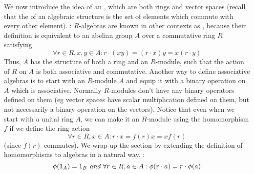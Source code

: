 \documentclass{article}
\begin{document}
\nn
We now introduce the idea of an , which are both rings and vector spaces (recall that the  of an algebraic structure is the set of elements which commute with every other element).
\nn
{}: 
\n
\Mo $ R $-algebras are known in other contexts as , because their definition is equivalent to an abelian group $ A $ over a commutative ring $ R $ satisfying
$$ \forall r \in R, x, y \in A: r \cdot (x y) = (r \cdot x) y = x (r \cdot y) $$
Thus, $ A $ has the structure of both a ring and an $ R $-module, such that the action of $ R $ on $ A $ is both associative and commutative. Another way to define associative algebras is to start with an $ R $-module $ A $ and equip it with a binary operation on $ A $ which is associative. Normally $ R $-modules don't have any binary operators defined on them (eg vector spaces have scalar multiplication defined on them, but not necessarily a binary operation on the vectors). Notice that even when we start with a unital ring $ A $, we can make it an $ R $-module using the homomorphism $ f $ if we define the ring action
$$ \forall r \in R, x \in A: r \cdot x = f(r) x = x f(r) $$
(since $ f(r) $ commutes).
\nn
We wrap up the section by extending the definition of homomorphisms to algebras in a natural way.
\nn
{}: 
$$ \phi(1_A) = 1_B \textit{ and } \forall r \in R, a \in A: \phi(r \cdot a) = r \cdot \phi(a) $$
\end{document}
